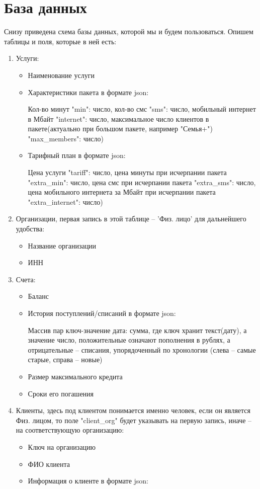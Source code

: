 \documentclass[oneside,senior,etd]{BYUPhysForDegree}
\begin{document}
\newpage
\section{База данных}

Снизу приведена схема базы данных, которой мы и будем пользоваться. Опишем таблицы и поля, которые в ней есть:
\begin{enumerate}
    \item Услуги: \begin{itemize}
        \item Наименование услуги
        \item Характеристики пакета в формате json:
        
        Кол-во минут "min": число, кол-во смс "sms": число, мобильный интернет в Мбайт "internet": число, максимальное число клиентов в пакете(актуально при большом пакете, например "Семья+") "max\_members": число)
        \item Тарифный план в формате json:
        
        Цена услуги "tariff": число, цена минуты при исчерпании пакета "extra\_min": число, цена смс при исчерпании пакета "extra\_sms": число, цена мобильного интернета за Мбайт при исчерпании пакета  "extra\_internet": число)
    \end{itemize}
    \item Организации, первая запись в этой таблице -- 'Физ. лицо' для дальнейшего удобства: \begin{itemize}
        \item Название организации
        \item ИНН
    \end{itemize}

    \item Счета: \begin{itemize}
        \item Баланс
        \item История поступлений/списаний в формате json:
        
        Массив пар ключ-значение дата: сумма, где ключ хранит текст(дату), а значение число, положительные означают пополнения в рублях, а отрицательные -- списания, упорядоченный по хронологии (слева -- самые старые, справа -- новые)
        \item Размер максимального кредита
        \item Сроки его погашения
    \end{itemize}

    \item Клиенты, здесь под клиентом понимается именно человек, если он является Физ. лицом, то поле "client\_org" будет указывать на первую запись, иначе -- на соответствующую организацию: \begin{itemize}
        \item Ключ на организацию
        \item ФИО клиента
        \item Информация о клиенте в формате json:


\end{itemize}
\end{enumerate}
\end{document}
